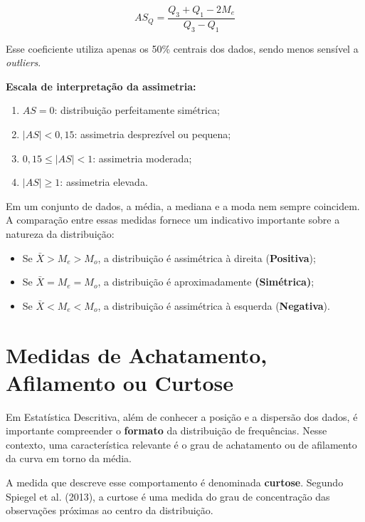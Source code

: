 \begin{equation}\label{eq:assimetriaQuartis}
AS_Q = \frac{Q_3 + Q_1 - 2M_e}{Q_3 - Q_1}
\end{equation}

Esse coeficiente utiliza apenas os 50\% centrais dos dados, sendo menos
sensível a \textit{outliers}. \vskip0.3cm

\textbf{Escala de interpretação da assimetria:}

\begin{enumerate}
    \item $AS = 0$: distribuição perfeitamente simétrica;
    \item $|AS| < 0,15$: assimetria desprezível ou pequena;
    \item $0,15 \leq |AS| < 1$: assimetria moderada;
    \item $|AS| \geq 1$: assimetria elevada.
\end{enumerate}

Em um conjunto de dados, a média, a mediana e a moda nem sempre coincidem.
A comparação entre essas medidas fornece um indicativo importante sobre a
natureza da distribuição:

\begin{itemize}
    \item Se $\bar{X} > M_e > M_o$, a distribuição é assimétrica à direita
    (\textbf{Positiva});
    \item Se $\bar{X} = M_e = M_o$, a distribuição é aproximadamente \textbf{(Simétrica)};
    \item Se $\bar{X} < M_e < M_o$, a distribuição é assimétrica à esquerda
    (\textbf{Negativa}).
\end{itemize}




\newpage
\section{Medidas de Achatamento, Afilamento ou Curtose}

Em Estatística Descritiva, além de conhecer a posição e a dispersão dos dados,
é importante compreender o \textbf{formato} da distribuição de frequências.
Nesse contexto, uma característica relevante é o grau de achatamento ou de
afilamento da curva em torno da média. \vskip0.3cm

A medida que descreve esse comportamento é denominada \textbf{curtose}.
Segundo Spiegel et al. (2013), a curtose é uma medida do grau de concentração
das observações próximas ao centro da distribuição. \vskip0.3cm

